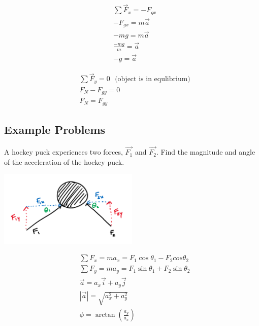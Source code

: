 $$
	\begin{aligned}
		&\sum \vec F_x = -F_{gx}\\
		&-F_{gx} = m\vec{a}\\
		&-mg = m\vec{a}\\
		&\frac{-mg}{m} = \vec{a}\\
		&{-g} = \vec{a}
	\end{aligned}
$$

$$
	\begin{aligned}
		&\sum \vec F_y = 0 \:\:\: \text{(object is in equlibrium)}\\
		&F_{N} - F_{gy} = 0\\
		&F_N = F_{gy}
	\end{aligned}
$$
\newpage

\subsection*{Example Problems}

\begin{problem}
	A hockey puck experiences two forces, $\vec{F_1}$ and $\vec{F_2}$. Find the magnitude and angle of the acceleration of the hockey puck.

	\begin{center}
		\includegraphics[width=0.5\textwidth]{chapters/ch3/images/fig3_5.PNG}
	\end{center}

	$$
		\begin{aligned}
			&\sum F_x = ma_x = F_1\cos\theta_1 - F_2cos\theta_2\\
			&\sum F_y = ma_y = F_1\sin\theta_1 + F_2\sin\theta_2\\
			&\vec a = a_x \vec i + a_y \vec j\\
			&|\vec a| = \sqrt{a_x^2 + a_y^2}\\
			&\phi = \arctan\left(\frac{a_y}{a_x}\right)
		\end{aligned}
	$$
\end{problem}



